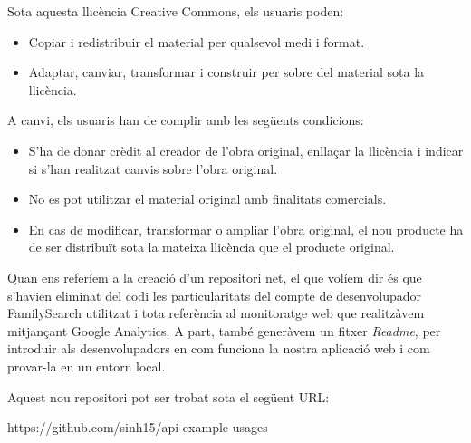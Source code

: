     Sota aquesta llicència Creative Commons, els usuaris poden:

    \begin{itemize}
        \item Copiar i redistribuir el material per qualsevol medi i format.
        \item Adaptar, canviar, transformar i construir per sobre del material sota la llicència.
    \end{itemize}

    A canvi, els usuaris han de complir amb les següents condicions:

    \begin{itemize}
        \item S'ha de donar crèdit al creador de l'obra original, enllaçar la llicència i indicar si s'han realitzat canvis sobre l'obra original.
        \item No es pot utilitzar el material original amb finalitats comercials.
        \item En cas de modificar, transformar o ampliar l'obra original, el nou producte ha de ser distribuït sota la mateixa llicència que el producte original.
    \end{itemize}

    Quan ens referíem a la creació d'un repositori net, el que volíem dir és que s'havien eliminat del codi les particularitats del compte de desenvolupador FamilySearch utilitzat i tota referència al monitoratge web que realitzàvem mitjançant Google Analytics. A part, també generàvem un fitxer \emph{Readme}, per introduir als desenvolupadors en com funciona la nostra aplicació web i com provar-la en un entorn local.

    Aquest nou repositori pot ser trobat sota el següent URL:

    https://github.com/sinh15/api-example-usages
